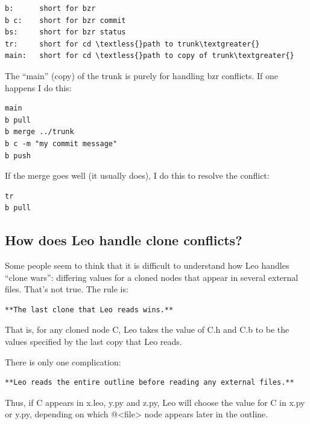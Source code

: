 \documentclass[a4paper,10pt,english]{sphinxmanual}
\begin{document}
\begin{Verbatim}[commandchars=\\\{\}]
b:      short for bzr
b c:    short for bzr commit
bs:     short for bzr status
tr:     short for cd \textless{}path to trunk\textgreater{}
main:   short for cd \textless{}path to copy of trunk\textgreater{}
\end{Verbatim}

The ``main'' (copy) of the trunk is purely for handling bzr conflicts.
If one happens I do this:

\begin{Verbatim}[commandchars=\\\{\}]
main
b pull
b merge ../trunk
b c -m "my commit message"
b push
\end{Verbatim}

If the merge goes well (it usually does), I do this to resolve the conflict:

\begin{Verbatim}[commandchars=\\\{\}]
tr
b pull
\end{Verbatim}


\subsection{How does Leo handle clone conflicts?}
\label{FAQ:how-does-leo-handle-clone-conflicts}
Some people seem to think that it is difficult to understand how Leo
handles ``clone wars'': differing values for a cloned nodes that appear in
several external files. That's not true. The rule is:

\begin{Verbatim}[commandchars=\\\{\}]
**The last clone that Leo reads wins.**
\end{Verbatim}

That is, for any cloned node C, Leo takes the value of C.h and C.b to
be the values specified by the last copy that Leo reads.

There is only one complication:

\begin{Verbatim}[commandchars=\\\{\}]
**Leo reads the entire outline before reading any external files.**
\end{Verbatim}

Thus, if C appears in x.leo, y.py and z.py, Leo will choose the value for C
in x.py or y.py, depending on which @\textless{}file\textgreater{} node appears later in the
outline.
\end{document}
